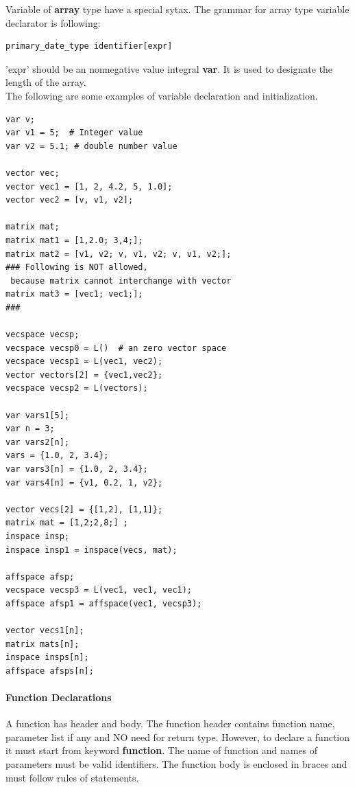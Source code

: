 \documentclass[12pt]{article} %
\begin{document}
Variable of \textbf{array} type have a special sytax. The grammar for array type variable declarator is following:

\begin{lstlisting}
primary_date_type identifier[expr]
\end{lstlisting}

'expr' should be an nonnegative value integral \textbf{var}.  It is used to designate the length of the array. \\
The following are some examples of variable declaration and initialization.

\begin{lstlisting}[mathescape=true]
var v;
var v1 = 5;  # Integer value
var v2 = 5.1; # double number value

vector vec;
vector vec1 = [1, 2, 4.2, 5, 1.0];
vector vec2 = [v, v1, v2];

matrix mat;
matrix mat1 = [1,2.0; 3,4;];
matrix mat2 = [v1, v2; v, v1, v2; v, v1, v2;];
### Following is NOT allowed,
 because matrix cannot interchange with vector
matrix mat3 = [vec1; vec1;];
###

vecspace vecsp;
vecspace vecsp0 = L()  # an zero vector space
vecspace vecsp1 = L(vec1, vec2);
vector vectors[2] = {vec1,vec2};
vecspace vecsp2 = L(vectors);

var vars1[5];
var n = 3;
var vars2[n];
vars = {1.0, 2, 3.4};
var vars3[n] = {1.0, 2, 3.4};
var vars4[n] = {v1, 0.2, 1, v2};

vector vecs[2] = {[1,2], [1,1]};
matrix mat = [1,2;2,8;] ;
inspace insp;
inspace insp1 = inspace(vecs, mat);

affspace afsp;
vecspace vecsp3 = L(vec1, vec1, vec1);
affspace afsp1 = affspace(vec1, vecsp3);

vector vecs1[n];
matrix mats[n];
inspace insps[n];
affspace afsps[n];

\end{lstlisting}

\paragraph{Function Declarations}
A function has header and body. The function header contains function name, parameter list if any and NO need for return type. However, to declare a function it must start from keyword \textbf{function}. The name of function and names of parameters must be valid identifiers. The function body is enclosed in braces and must follow rules of statements.
\end{document}
